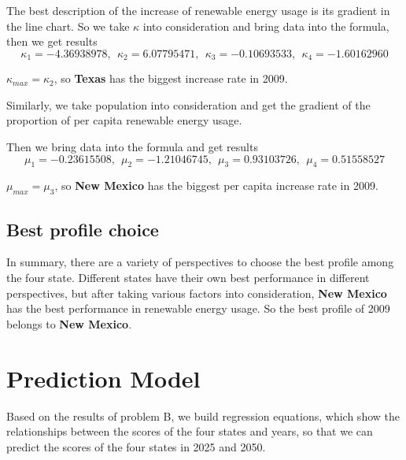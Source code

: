 \documentclass[a4paper,11pt]{article}
\begin{document}
\par The best description of the increase of renewable energy usage is its gradient in the line chart. So we take $\kappa$ into consideration and bring data into the formula, then we get results
\begin{equation}
    \kappa_{1} = -4.36938978,~~ \kappa_{2} = 6.07795471,~~ \kappa_{3} = -0.10693533,~~ \kappa_{4} = -1.60162960
\end{equation}
\par $\kappa_{max} = \kappa_{2}$, so \textbf{Texas} has the biggest increase rate in 2009.

\par Similarly, we take population into consideration and get the gradient of the  proportion of per capita renewable energy usage. 

\par Then we bring data into the formula and get results
\begin{equation}
    \mu_{1} = -0.23615508,~~ \mu_{2} = -1.21046745,~~ \mu_{3} = 0.93103726,~~ \mu_{4} = 0.51558527
\end{equation}
\par $\mu_{max} = \mu_{3}$, so \textbf{New Mexico} has the biggest per capita increase rate in 2009.

\subsection{Best profile choice}
\par In summary, there are a variety of perspectives to choose the best profile among the four state. Different states have their own best performance in different perspectives, but after taking various factors into consideration,  \textbf{New Mexico} has the best performance in renewable energy usage.
So the best profile of 2009 belongs to \textbf{New Mexico}.


\section{Prediction Model}
\par Based on the results of problem B, we build regression equations, which show the relationships between the scores of the four states and years, so that we can predict the scores of the four states in 2025 and 2050.
\end{document}
